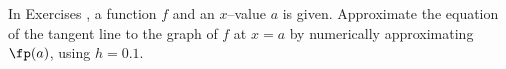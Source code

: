 {\noindent In Exercises}
{, a function $f$ and an $x$--value $a$ is given. Approximate the equation of the tangent line to the graph of $f$ at $x=a$ by numerically approximating $\fp(a)$, using $h=0.1$.
}
